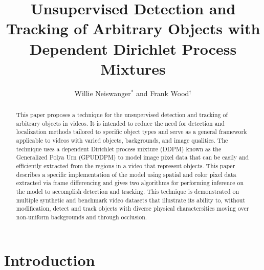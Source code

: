 \documentclass{article}
\begin{document}

\title{Unsupervised Detection and Tracking of Arbitrary Objects with Dependent Dirichlet Process Mixtures}
\author{Willie Neiswanger$^{*}$ and Frank Wood$^{\dagger}$}
\maketitle



\begin{abstract}
This paper proposes a technique for the unsupervised detection and tracking of arbitrary objects in videos. It is intended to reduce the need for detection and localization methods tailored to specific object types and serve as a general framework applicable to videos with varied objects, backgrounds, and image qualities. The technique uses a dependent Dirichlet process mixture (DDPM) known as the Generalized Polya Urn (GPUDDPM) to model image pixel data that can be easily and efficiently extracted from the regions in a video that represent objects. This paper describes a specific implementation of the model using spatial and color pixel data extracted via frame differencing and gives two algorithms for performing inference on the model to accomplish detection and tracking. This technique is demonstrated on multiple synthetic and benchmark video datasets that illustrate its ability to, without modification, detect and track objects with diverse physical charactersitics moving over non-uniform backgrounds and through occlusion.
\end{abstract}




\section{Introduction}
\label{sec:introduction}
\end{document}
